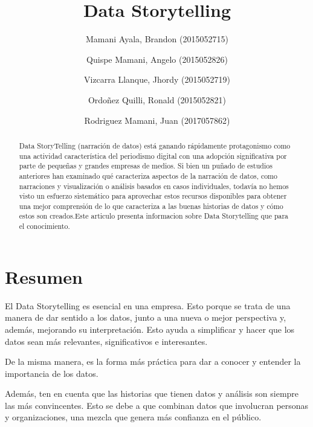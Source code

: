 \documentclass[preprint,12pt]{elsarticle}
\begin{document}
	
	\begin{frontmatter}
		
		
		\title{\huge Data Storytelling}
		
		\author{Mamani Ayala, Brandon        (2015052715)}
		\author{Quispe Mamani, Angelo	      (2015052826)}
		\author{Vizcarra Llanque, Jhordy	      (2015052719)}
		\author{Ordoñez Quilli, Ronald          (2015052821)}
		\author{Rodriguez Mamani, Juan      (2017057862)}
		
		\address{Tacna, Perú}
		
		\begin{abstract}
			Data StoryTelling (narración de datos) está ganando rápidamente protagonismo como una actividad característica del periodismo digital con una adopción significativa por parte de pequeñas y grandes empresas de medios. Si bien un puñado de estudios anteriores han examinado qué caracteriza aspectos de la narración de datos, como narraciones y visualización o análisis basados en casos individuales, todavía no hemos visto un esfuerzo sistemático para aprovechar estos recursos disponibles para obtener una mejor comprensión de lo que caracteriza a las buenas historias de datos y cómo estos son creados.Este articulo presenta informacion sobre Data Storytelling que para el conocimiento. 


	
		\end{abstract}
\end{frontmatter}

	
	
	\section{Resumen}

El Data Storytelling es esencial en una empresa. Esto porque se trata de una manera de dar sentido a los datos, junto a una nueva o mejor perspectiva y, además, mejorando su interpretación. Esto ayuda a simplificar y hacer que los datos sean más relevantes, significativos e interesantes.

De la misma manera, es la forma más práctica para dar a conocer y entender la importancia de los datos.

Además, ten en cuenta que las historias que tienen datos y análisis son siempre las más convincentes. Esto se debe a que combinan datos que involucran personas y organizaciones, una mezcla que genera más confianza en el público.
\end{document}
